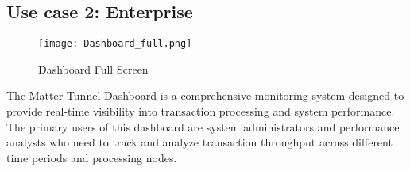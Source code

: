 \documentclass[conference]{IEEEtran}
\begin{document}
\vspace{5cm}

\subsection{Use case 2: Enterprise}
    
\begin{figure}[h!]
	\centering
	\texttt{[image: Dashboard\_full.png]}
	\caption{Dashboard Full Screen}
	\label{fig:Dashboard_full}
\end{figure}
    
The Matter Tunnel Dashboard is a comprehensive monitoring system designed to provide real-time visibility into transaction processing and system performance. The primary users of this dashboard are system administrators and performance analysts who need to track and analyze transaction throughput across different time periods and processing nodes.
\end{document}
